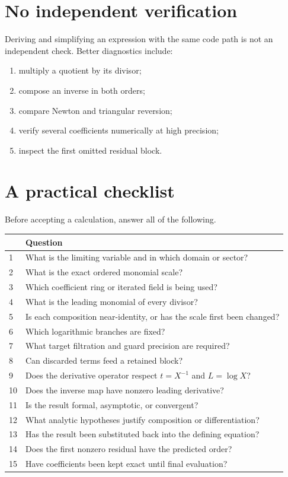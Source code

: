 \documentclass[11pt,oneside]{book}
\theoremstyle{definition}
\theoremstyle{remark}
\begin{document}
\section{No independent verification}
Deriving and simplifying an expression with the same code path is not an
independent check. Better diagnostics include:
\begin{enumerate}
\item multiply a quotient by its divisor;
\item compose an inverse in both orders;
\item compare Newton and triangular reversion;
\item verify several coefficients numerically at high precision;
\item inspect the first omitted residual block.
\end{enumerate}

\section{A practical checklist}
Before accepting a calculation, answer all of the following.

\begin{longtable}{@{}p{}p{}@{}}
\toprule
&Question\\
\midrule
1&What is the limiting variable and in which domain or sector?\\
2&What is the exact ordered monomial scale?\\
3&Which coefficient ring or iterated field is being used?\\
4&What is the leading monomial of every divisor?\\
5&Is each composition near-identity, or has the scale first been changed?\\
6&Which logarithmic branches are fixed?\\
7&What target filtration and guard precision are required?\\
8&Can discarded terms feed a retained block?\\
9&Does the derivative operator respect $t=X^{-1}$ and $L=\log X$?\\
10&Does the inverse map have nonzero leading derivative?\\
11&Is the result formal, asymptotic, or convergent?\\
12&What analytic hypotheses justify composition or differentiation?\\
13&Has the result been substituted back into the defining equation?\\
14&Does the first nonzero residual have the predicted order?\\
15&Have coefficients been kept exact until final evaluation?\\
\bottomrule
\end{longtable}
\end{document}
